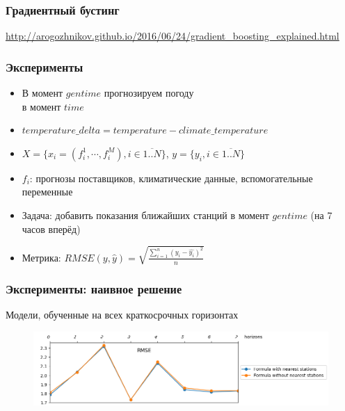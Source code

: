 \documentclass{beamer}
\begin{document}
\begin{frame}\frametitle{Градиентный бустинг}
\begin{figure}[H]
\end{figure}
{\tiny \color{gray} \url{http://arogozhnikov.github.io/2016/06/24/gradient_boosting_explained.html}}
\end{frame}



\begin{frame}\frametitle{Эксперименты}
\begin{itemize}
    \item В момент $gentime$ прогнозируем погоду \\ в момент $time$
    \item $temperature\_delta = temperature - climate\_temperature$
    \item $X = \{x_i = (f^1_{i}, \cdots, f^M_i), i \in \overline{1..N}\}$, $y = \{y_i, i \in \overline{1..N}\}$
    \item $f_i$: прогнозы поставщиков, климатические данные, вспомогательные переменные
    \item Задача: добавить показания ближайших станций в момент $gentime$ (на 7 часов вперёд)
    \item Метрика: $RMSE(y, \hat{y}) = \sqrt{\frac{\sum^{n}_{i=1}{(y_i - \hat{y_i})^2}}{n}}$
\end{itemize}
\end{frame}


\begin{frame}\frametitle{Эксперименты: наивное решение}

Модели, обученные на всех краткосрочных горизонтах

\begin{figure}
\centering
\includegraphics[width=\linewidth]{images/pic1_metrics_initial.png}
\end{figure}

\end{frame}
\end{document}
